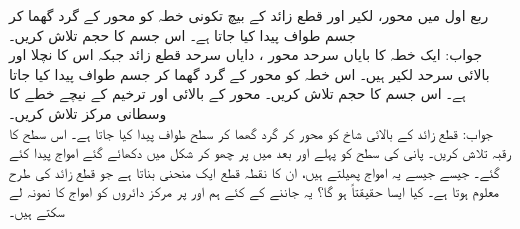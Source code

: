 ربع اول میں  محور، لکیر  اور قطع زائد  کے بیچ تکونی خطہ کو  محور کے گرد گھما کر جسم طواف پیدا کیا جاتا ہے۔  اس جسم کا حجم تلاش کریں۔\\
جواب:\quad
{}
ایک خطہ کا بایاں سرحد محور ، دایاں سرحد قطع زائد   جبکہ اس کا نچلا اور بالائی سرحد لکیر  ہیں۔ اس خطہ کو  محور کے گرد گھما کر جسم طواف پیدا کیا جاتا ہے۔ اس جسم کا حجم تلاش کریں۔ 
محور  کے بالائی اور ترخیم  کے نیچے  خطے کا وسطانی مرکز تلاش کریں۔\\
جواب:\quad
{}
قطع زائد  کے بالائی شاخ  کو  محور کر گرد گھما کر سطح طواف پیدا کیا جاتا ہے۔ اس سطح کا رقبہ تلاش کریں۔
پانی کی سطح کو پہلے  اور بعد میں  پر چھو کر شکل  میں دکھائے گئے امواج پیدا کئے گئے۔ جیسے جیسے یہ امواج پھیلتے ہیں، ان کا نقطہ قطع ایک منحنی بناتا ہے جو قطع زائد کی طرح معلوم ہوتا ہے۔ کیا ایسا حقیقتاً ہو گا؟  یہ جاننے کے کئے ہم  اور  پر مرکز دائروں کو امواج کا نمونہ لے سکتے ہیں۔

